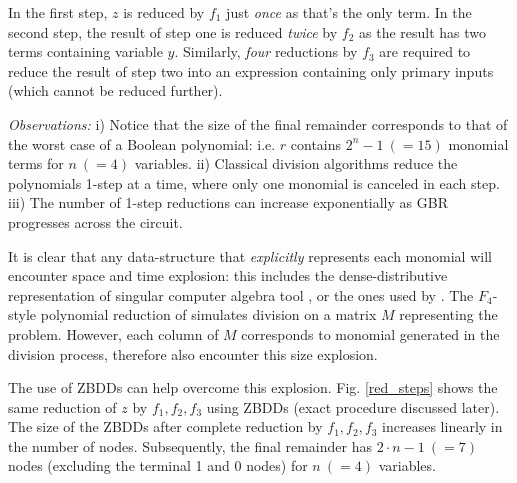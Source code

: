 In the first step, $z$ is reduced by $f_1$ just {\it once} as that's the only term. In the
second step, the result of step one is reduced {\it twice} by $f_2$ as
the result has two terms containing variable $y$. Similarly,
{\it four} reductions by $f_3$ are required to 
reduce the result of step two into an expression containing only
primary inputs (which cannot be reduced further). 

{\it Observations:} i) Notice that the size of the final remainder 
corresponds to that of the worst case of a Boolean polynomial:
i.e. $r$ contains $2^n - 1\ (=15)$ monomial terms for $n\ (=4)$ variables. ii)
Classical division algorithms reduce the polynomials 1-step at a time,
where only one monomial is canceled in each step. iii) The number of
1-step reductions can increase exponentially as GBR progresses across
the circuit. 

It is clear that any data-structure that {\it explicitly} represents
each monomial will encounter space and time explosion: this includes
the dense-distributive representation of {\sc singular} computer
algebra tool \cite{DGPS}, or the ones used by
\cite{ciesielski:dac2015,rolf:date16}. The $F_4$-style
polynomial reduction of \cite{lv:tcad2013,pruss:tcad} simulates
division on a matrix $M$ representing the problem. However, each column
of $M$ corresponds to monomial generated in the division process,
therefore \cite{lv:tcad2013,pruss:tcad} also encounter this size
explosion. 

The use of ZBDDs can help overcome this explosion. Fig. \ref{red_steps} shows
the same reduction of $z$ by $f_1,f_2,f_3$ using ZBDDs (exact
procedure discussed later). The size of the ZBDDs after complete reduction by
$f_1,f_2,f_3$ increases linearly in the number of nodes. Subsequently, the final remainder has 
$2\cdot n - 1\ (=7)$ nodes (excluding the terminal 1 and 0 nodes) for $n\ (=4)$ variables.



